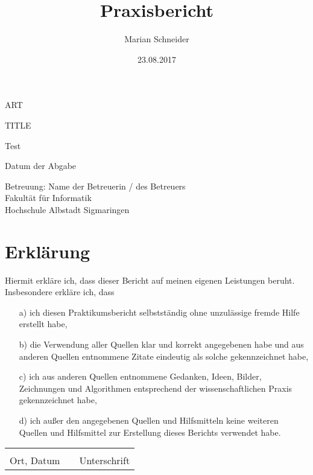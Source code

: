 \documentclass[a4paper, 12pt]{scrartcl}
\title{Praxisbericht}
\author{Marian Schneider}
\date{23.08.2017}
\newcommand{\nameOfCreator}{Test}
\begin{document}
\pagestyle{empty}
	
\begin{titlepage}
	\begin{center} \large 
		    
		ART
		\vspace*{2cm}
		
		{\huge TITLE}
		\vspace*{2.5cm}
		
		\nameOfCreator
		\vspace*{1.5cm}
		
		Datum der Abgabe
		\vspace*{4.5cm}
		
		
		Betreuung: Name der Betreuerin / des Betreuers \\[1cm]
		Fakultät für Informatik \\[1cm]
		Hochschule Albstadt Sigmaringen
		  		
	\end{center}
\end{titlepage}
	
	
\section{Erklärung}
Hiermit erkläre ich, dass dieser Bericht auf meinen eigenen Leistungen beruht. Insbesondere erkläre ich, dass 
\begin{itemize}
	\item[a)] ich diesen Praktikumsbericht selbstständig ohne unzulässige fremde Hilfe 					  erstellt habe,
	\item[b)] die Verwendung aller Quellen klar und korrekt angegebenen habe und aus 					  anderen Quellen entnommene Zitate eindeutig als solche gekennzeichnet 					  habe,
	\item[c)] ich aus anderen Quellen entnommene Gedanken, Ideen, Bilder, Zeichnungen 					  und Algorithmen entsprechend der wissenschaftlichen Praxis 								  gekennzeichnet habe,
	\item[d)] ich außer den angegebenen Quellen und Hilfsmitteln keine weiteren 						  Quellen und Hilfsmittel zur Erstellung dieses Berichts verwendet habe.
\end{itemize}
\vspace*{1.5cm}
\begin{center}
	\begin{tabular}{lp{2em}l}
		\hspace{3cm} &   & \hspace{3cm} \\\cline{1-1}\cline{3-3}
		Ort, Datum   &   & Unterschrift 
	\end{tabular}
\end{center}
\end{document}
